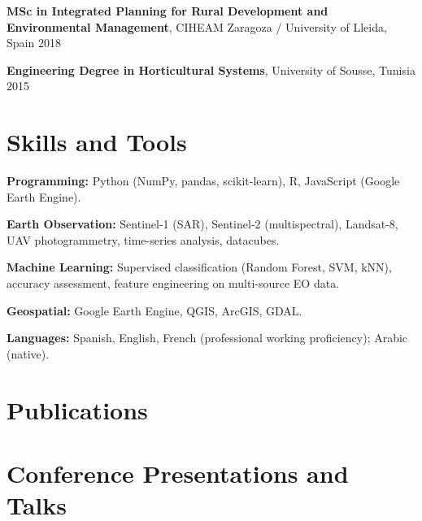 \documentclass[10pt, a4paper]{article}
\begin{document}
\vspace{0.2cm}

\textbf{MSc in Integrated Planning for Rural Development and Environmental Management}, CIHEAM Zaragoza / University of Lleida, Spain \hfill 2018

\vspace{0.2cm}

\textbf{Engineering Degree in Horticultural Systems}, University of Sousse, Tunisia \hfill 2015

\section{Skills and Tools}

\textbf{Programming:} Python (NumPy, pandas, scikit-learn), R, JavaScript (Google Earth Engine).

\vspace{0.2cm}

\textbf{Earth Observation:} Sentinel-1 (SAR), Sentinel-2 (multispectral), Landsat-8, UAV photogrammetry, time-series analysis, datacubes.

\vspace{0.2cm}

\textbf{Machine Learning:} Supervised classification (Random Forest, SVM, kNN), accuracy assessment, feature engineering on multi-source EO data.

\vspace{0.2cm}

\textbf{Geospatial:} Google Earth Engine, QGIS, ArcGIS, GDAL.

\vspace{0.2cm}

\textbf{Languages:} Spanish, English, French (professional working proficiency); Arabic (native).

\section{Publications}

\nocite{*}
\printbibliography[heading=none]

\section{Conference Presentations and Talks}
\end{document}

